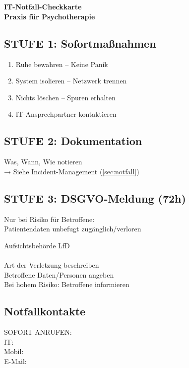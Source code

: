 \section*{} %
\label{sec:anhang-notfallkarte}

\ifaccessible
  \textbf{\Large IT-Notfall-Checkkarte}\\
  \textbf{Praxis für Psychotherapie \PraxisInhaberin}

  \subsection*{STUFE 1: Sofortmaßnahmen}
  \begin{enumerate}
    \item Ruhe bewahren -- Keine Panik
    \item System isolieren -- Netzwerk trennen
    \item Nichts löschen -- Spuren erhalten
    \item IT-Ansprechpartner kontaktieren
  \end{enumerate}

  \subsection*{STUFE 2: Dokumentation}
  Was, Wann, Wie notieren\\
  → Siehe Incident-Management (\cref{sec:notfall})

  \subsection*{STUFE 3: DSGVO-Meldung (72h)}
  Nur bei Risiko für Betroffene:\\
  Patientendaten unbefugt zugänglich/verloren

  Aufsichtsbehörde LfD\\
  \DatenschutzbehoerdeAdresse\\
  \BoxEmpty{} Art der Verletzung beschreiben\\
  \BoxEmpty{} Betroffene Daten/Personen angeben\\
  \BoxEmpty{} Bei hohem Risiko: Betroffene informieren

  \subsection*{Notfallkontakte}
  SOFORT ANRUFEN:\\
  IT: \ITAnsprechpartner\\
  Mobil: \ITAnsprechpartnerTelefon\\
  E-Mail: \href{mailto:\ITAnsprechpartnerMail}{\ITAnsprechpartnerMail}

